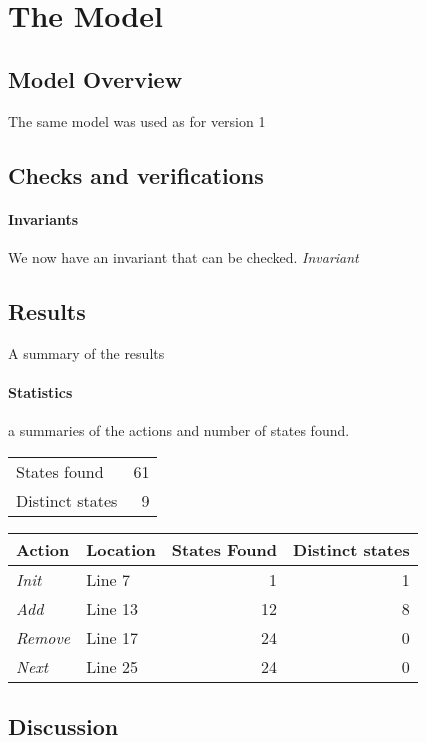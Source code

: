 \documentclass[12pt]{article}
\begin{document}
\section{The Model}


\subsection{Model Overview}
The same model was used as for version 1

\subsection{Checks and verifications}
\paragraph{Invariants} We now have an invariant that can be checked.
\textit{Invariant}

\subsection{Results} A summary of the results
\paragraph{Statistics} a summaries of the actions and number of states
found.

\begin{table}[h]
\begin{tabular}{lr}
	States found & \num{61} \\
 Distinct states & \num{9} \\ 
\end{tabular}
\end{table}

\begin{table}[h]
\begin{tabular}{llrr}
	\textbf{Action} & Location & States Found & \textbf{Distinct states} \\
	\hline
	\textit{Init}   & Line 7 & 1 & 1 \\
	\textit{Add}    & Line 13 & 12 & 8 \\
	\textit{Remove} & Line 17 & 24 & 0 \\
	\textit{Next}   & Line 25 & 24 & 0 \\
\end{tabular}
\end{table}

\subsection{Discussion}
\end{document}
